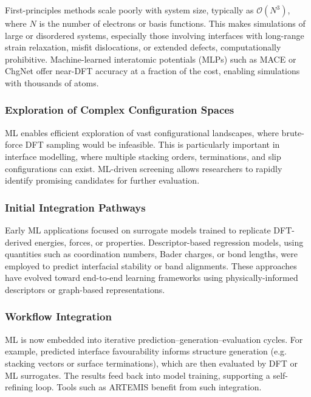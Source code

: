 First-principles methods scale poorly with system size, typically as \( \mathcal{O}(N^3) \), where \( N \) is the number of electrons or basis functions. This makes simulations of large or disordered systems, especially those involving interfaces with long-range strain relaxation, misfit dislocations, or extended defects, computationally prohibitive. Machine-learned interatomic potentials (MLPs) such as MACE or ChgNet offer near-DFT accuracy at a fraction of the cost, enabling simulations with thousands of atoms. 
 
\subsubsection{Exploration of Complex Configuration Spaces} 
 
ML enables efficient exploration of vast configurational landscapes, where brute-force DFT sampling would be infeasible. This is particularly important in interface modelling, where multiple stacking orders, terminations, and slip configurations can exist. ML-driven screening allows researchers to rapidly identify promising candidates for further evaluation. 
 
\subsubsection{Initial Integration Pathways} 
 
Early ML applications focused on surrogate models trained to replicate DFT-derived energies, forces, or properties. Descriptor-based regression models, using quantities such as coordination numbers, Bader charges, or bond lengths, were employed to predict interfacial stability or band alignments. These approaches have evolved toward end-to-end learning frameworks using physically-informed descriptors or graph-based representations. 
 
\subsubsection{Workflow Integration} 
 
ML is now embedded into iterative prediction--generation--evaluation cycles. For example, predicted interface favourability informs structure generation (e.g. stacking vectors or surface terminations), which are then evaluated by DFT or ML surrogates. The results feed back into model training, supporting a self-refining loop. Tools such as ARTEMIS benefit from such integration. 
 

